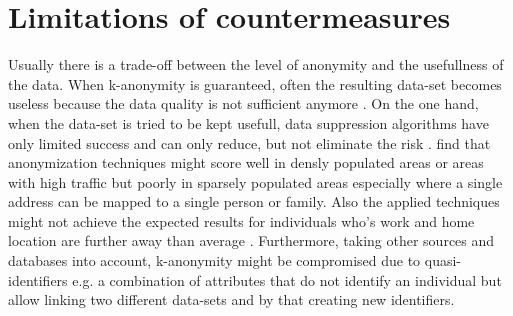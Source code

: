 \section{Limitations of countermeasures}
Usually there is a trade-off between the level of anonymity and the usefullness of the data. When k-anonymity is guaranteed, often the resulting data-set becomes useless because the data quality is not sufficient anymore \parencite{krumm, cellphone, k-anonymity-old, k-anonymity, k-anonymity-achieving}.
On the one hand, when the data-set is tried to be kept usefull, data suppression algorithms have only limited success and can only reduce, but not eliminate the risk \parencite{hoh2006enhancing}. \parencite{time-to-confusion, location-privacy, hoh2006enhancing} find that anonymization techniques might score well in densly populated areas or areas with high traffic but poorly in sparsely populated areas especially where a single address can be mapped to a single person or family. Also the applied techniques might not achieve the expected results for individuals who's work and home location are further away than average \parencite{privacy-home-work-pairs}.
Furthermore, taking other sources and databases into account, k-anonymity might be compromised due to quasi-identifiers \parencite{k-anonymity-achieving} e.g. a combination of attributes that do not identify an individual but allow linking two different data-sets and by that creating new identifiers.




